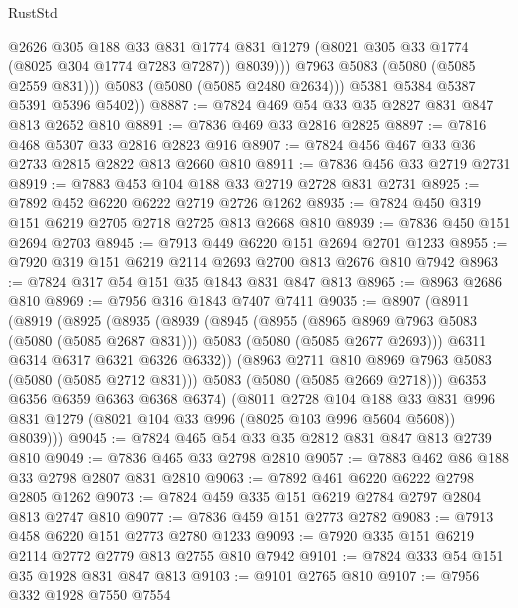 \begin{lexlean}{RustStd}
\begin{coremodule}
                  @2626
                  @305
                  @188
                  @33
                  @831
                  @1774
                  @831
                  @1279
                  (@8021 @305 @33 @1774 (@8025 @304 @1774 @7283 @7287))
                  @8039)))
            @7963
            @5083
            (@5080 (@5085 @2559 @831)))
          @5083
          (@5080 (@5085 @2480 @2634)))
        @5381
        @5384
        @5387
        @5391
        @5396
        @5402))
@8887 := @7824 @469 @54 @33 @35 @2827 @831 @847 @813 @2652 @810
@8891 := @7836 @469 @33 @2816 @2825
@8897 := @7816 @468 @5307 @33 @2816 @2823 @916
@8907 := @7824 @456 @467 @33 @36 @2733 @2815 @2822 @813 @2660 @810
@8911 := @7836 @456 @33 @2719 @2731
@8919 := @7883 @453 @104 @188 @33 @2719 @2728 @831 @2731
@8925 := @7892 @452 @6220 @6222 @2719 @2726 @1262
@8935 := @7824 @450 @319 @151 @6219 @2705 @2718 @2725 @813 @2668 @810
@8939 := @7836 @450 @151 @2694 @2703
@8945 := @7913 @449 @6220 @151 @2694 @2701 @1233
@8955 := @7920 @319 @151 @6219 @2114 @2693 @2700 @813 @2676 @810 @7942
@8963 := @7824 @317 @54 @151 @35 @1843 @831 @847 @813
@8965 := @8963 @2686 @810
@8969 := @7956 @316 @1843 @7407 @7411
@9035 := @8907
    (@8911
      (@8919
        (@8925
          (@8935
            (@8939
              (@8945
                (@8955
                  (@8965 @8969 @7963 @5083 (@5080 (@5085 @2687 @831)))
                  @5083
                  (@5080 (@5085 @2677 @2693)))
                @6311
                @6314
                @6317
                @6321
                @6326
                @6332))
            (@8963 @2711 @810 @8969 @7963 @5083 (@5080 (@5085 @2712 @831)))
            @5083
            (@5080 (@5085 @2669 @2718)))
          @6353
          @6356
          @6359
          @6363
          @6368
          @6374)
        (@8011
          @2728
          @104
          @188
          @33
          @831
          @996
          @831
          @1279
          (@8021 @104 @33 @996 (@8025 @103 @996 @5604 @5608))
          @8039)))
@9045 := @7824 @465 @54 @33 @35 @2812 @831 @847 @813 @2739 @810
@9049 := @7836 @465 @33 @2798 @2810
@9057 := @7883 @462 @86 @188 @33 @2798 @2807 @831 @2810
@9063 := @7892 @461 @6220 @6222 @2798 @2805 @1262
@9073 := @7824 @459 @335 @151 @6219 @2784 @2797 @2804 @813 @2747 @810
@9077 := @7836 @459 @151 @2773 @2782
@9083 := @7913 @458 @6220 @151 @2773 @2780 @1233
@9093 := @7920 @335 @151 @6219 @2114 @2772 @2779 @813 @2755 @810 @7942
@9101 := @7824 @333 @54 @151 @35 @1928 @831 @847 @813
@9103 := @9101 @2765 @810
@9107 := @7956 @332 @1928 @7550 @7554

\end{coremodule}
\end{lexlean}
